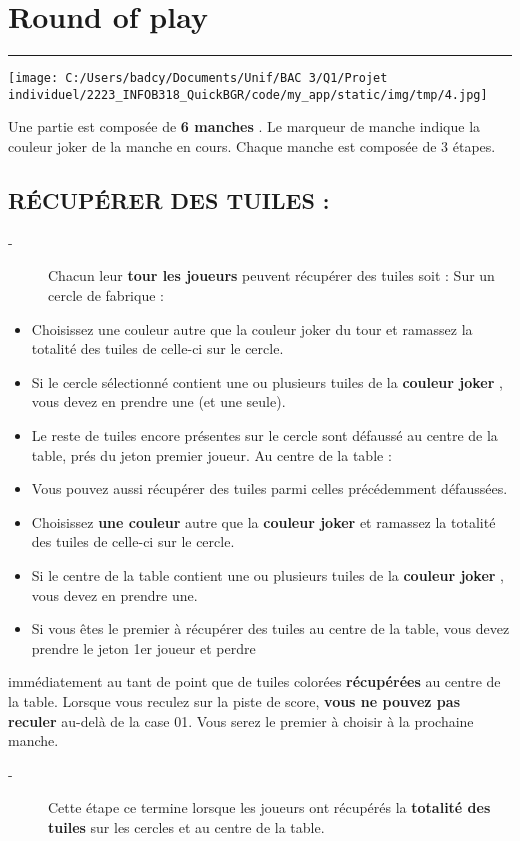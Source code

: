 \documentclass{scrartcl}%
\begin{document}
%
\section{ Round of play
}%
\label{sec:Roundofplay}%
\rule{18cm}{0.07cm}\break%
%
\begin{center}\texttt{[image: C:/Users/badcy/Documents/Unif/BAC 3/Q1/Projet individuel/2223\_INFOB318\_QuickBGR/code/my\_app/static/img/tmp/4.jpg]}\end{center}%

%
Une partie est composée de %
\textbf{6 manches}%
. Le marqueur de manche indique la couleur joker de la manche en cours. Chaque manche est composée de 3 étapes.


%
\subsection{ RÉCUPÉRER DES TUILES :
}%
\label{subsec:RCUPRERDESTUILES}%
\begin{description}%
\item[{-} ]%
%
 Chacun leur %
\textbf{tour les joueurs}%
\textit{ }%
 peuvent récupérer des tuiles soit : Sur un cercle de fabrique :
%
\end{description}%
\begin{itemize}%
\item%
%
 Choisissez une couleur autre que la couleur joker du tour et ramassez la totalité des tuiles de celle{-}ci sur le cercle.
%
\item%
%
 Si le cercle sélectionné contient une ou plusieurs tuiles de la %
\textbf{couleur joker}%
, vous devez en prendre une (et une seule).
%
\item%
%
 Le reste de tuiles encore présentes sur le cercle sont défaussé au centre de la table, prés du jeton premier joueur. Au centre de la table :
%
\item%
%
 Vous pouvez aussi récupérer des tuiles parmi celles précédemment défaussées.
%
\item%
%
 Choisissez %
\textbf{une couleur}%
\textit{ }%
 autre que la %
\textbf{couleur joker}%
\textit{ }%
 et ramassez la totalité des tuiles de celle{-}ci sur le cercle.
%
\item%
%
 Si le centre de la table contient une ou plusieurs tuiles de la %
\textbf{couleur joker}%
, vous devez en prendre une.
%
\item%
%
 Si vous êtes le premier à récupérer des tuiles au centre de la table, vous devez prendre le jeton 1er joueur et perdre
%
\end{itemize}%
immédiatement au tant de point que de tuiles colorées %
\textbf{récupérées}%
\textit{ }%
 au centre de la table. Lorsque vous reculez sur la piste de score, %
\textbf{vous ne pouvez pas reculer}%
\textit{ }%
 au{-}delà de la case 01. Vous serez le premier à choisir à la prochaine manche.
%
\begin{description}%
\item[{-} ]%
%
 Cette étape ce termine lorsque les joueurs ont récupérés la %
\textbf{totalité des tuiles}%
\textit{ }%
 sur les cercles et au centre de la table.
%
\end{description}
\end{document}
